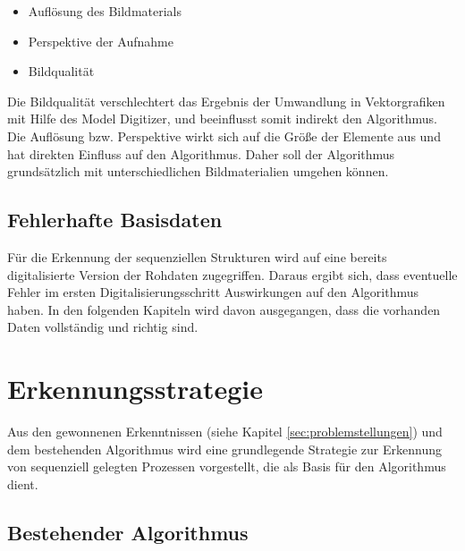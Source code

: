 \begin{itemize}
	\item Auflösung des Bildmaterials
	\item Perspektive der Aufnahme
	\item Bildqualität
\end{itemize}

Die Bildqualität verschlechtert das Ergebnis der Umwandlung in Vektorgrafiken mit Hilfe des Model Digitizer, und beeinflusst somit indirekt den Algorithmus. Die Auflösung bzw. Perspektive wirkt sich auf die Größe der Elemente aus und hat direkten Einfluss auf den Algorithmus. Daher soll der Algorithmus grundsätzlich mit unterschiedlichen Bildmaterialien umgehen können.

\subsection{Fehlerhafte Basisdaten} %
\label{sub:fehlerhafte_basisdaten}
Für die Erkennung der sequenziellen Strukturen wird auf eine bereits digitalisierte Version der Rohdaten zugegriffen. Daraus ergibt sich, dass eventuelle Fehler im ersten Digitalisierungsschritt Auswirkungen auf den Algorithmus haben. In den folgenden Kapiteln wird davon ausgegangen, dass die vorhanden Daten vollständig und richtig sind.


\section{Erkennungsstrategie} %
\label{sec:erkennungsstrategie}
Aus den gewonnenen Erkenntnissen (siehe Kapitel \ref{sec:problemstellungen}) und dem bestehenden Algorithmus \cite{max} wird eine grundlegende Strategie zur Erkennung von sequenziell gelegten Prozessen vorgestellt, die als Basis für den Algorithmus dient.

\subsection{Bestehender Algorithmus} %
\label{sub:unterscheidung_der_legemethode}


